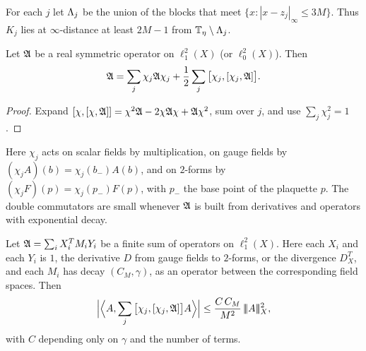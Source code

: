 For each $j$ let $\Lambda_j$ be the union of the blocks that meet $\{x:|x-z_j|_\infty\le3M\}$. Thus $K_j$ lies at $\infty$-distance at least $2M-1$ from $\mathbb T_\eta\setminus\Lambda_j$.

\begin{lemma}\label{lem:IMS}
Let $\mathfrak A$ be a real symmetric operator on $\ell^2_1(X)$ (or $\ell^2_0(X)$). Then
\[
\mathfrak A=\sum_j\chi_j\mathfrak A\chi_j+\frac12\sum_j\big[\chi_j,[\chi_j,\mathfrak A]\big].
\]
\end{lemma}

\begin{proof}
Expand $[\chi,[\chi,\mathfrak A]]=\chi^2\mathfrak A-2\chi\mathfrak A\chi+\mathfrak A\chi^2$, sum over $j$, and use $\sum_j\chi_j^2=1$.
\end{proof}

Here $\chi_j$ acts on scalar fields by multiplication, on gauge fields by $(\chi_jA)(b)=\chi_j(b_-)A(b)$, and on $2$-forms by $(\chi_jF)(p)=\chi_j(p_-)F(p)$, with $p_-$ the base point of the plaquette $p$. The double commutators are small whenever $\mathfrak A$ is built from derivatives and operators with exponential decay.

\begin{lemma}\label{lem:double-comm}
Let $\mathfrak A=\sum_iX_i^TM_iY_i$ be a finite sum of operators on $\ell^2_1(X)$. Here each $X_i$ and each $Y_i$ is $1$, the derivative $D$ from gauge fields to $2$-forms, or the divergence $D^T_X$, and each $M_i$ has decay $(C_M,\gamma)$, as an operator between the corresponding field spaces. Then
\[
\Big|\Big\langle A,\sum_j\big[\chi_j,[\chi_j,\mathfrak A]\big]A\Big\rangle\Big|\le\frac{C\,C_M}{M^2}\,|\!|\!|A|\!|\!|_X^2 ,
\]
with $C$ depending only on $\gamma$ and the number of terms.
\end{lemma}

